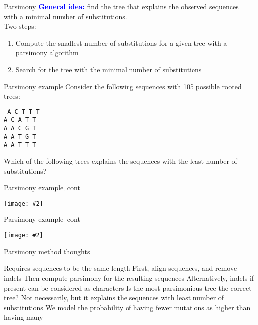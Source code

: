 \documentclass{beamer}
\renewcommand{\c}[1]{\begin{center}#1\end{center}}
\newcommand{\blu}[1]{\textcolor{blue}{\textbf{#1}}}
\newcommand{\gr}[2][.95]{\c{\texttt{[image: \#2]}}}
\begin{document}
\begin{frame}{Parsimony}
    \blu{General idea:} find the tree that explains the observed sequences with a minimal number of substitutions.\\
    \bigskip
    Two steps:
    \begin{enumerate}
        \item Compute the smallest number of substitutions for a given tree with a parsimony algorithm 
        \item Search for the tree with the minimal number of substitutions
    \end{enumerate}
\end{frame}

\begin{frame}{Parsimony example}
    Consider the following sequences with 105 possible rooted trees:
    \begin{center}
        \texttt{%
            A C T T T\\
            A C A T T\\
            A A C G T\\
            A A T G T\\
            A A T T T\\
        }
    \end{center}
    \bigskip
    Which of the following trees explains the sequences with the least number of substitutions?
\end{frame}

\begin{frame}{Parsimony example, cont}
    \gr{l5_figs/s15_parsimonious.png}
\end{frame}

\begin{frame}{Parsimony example, cont}
    \gr{l5_figs/s16_parsimonious2.png}
\end{frame}

\begin{frame}{Parsimony method thoughts}
    \begin{outline}
        \1[] Requires sequences to be the same length
            \2 First, align sequences, and remove indels
            \2 Then compute parsimony for the resulting sequences
            \2 Alternatively, indels if present can be considered as characters
        \1[] Is the most parsimonious tree the correct tree?
            \2 Not necessarily, but it explains the sequences with least number of substitutions
            \2 We model the probability of having fewer mutations as higher than having many
    \end{outline}
\end{frame}
\end{document}
